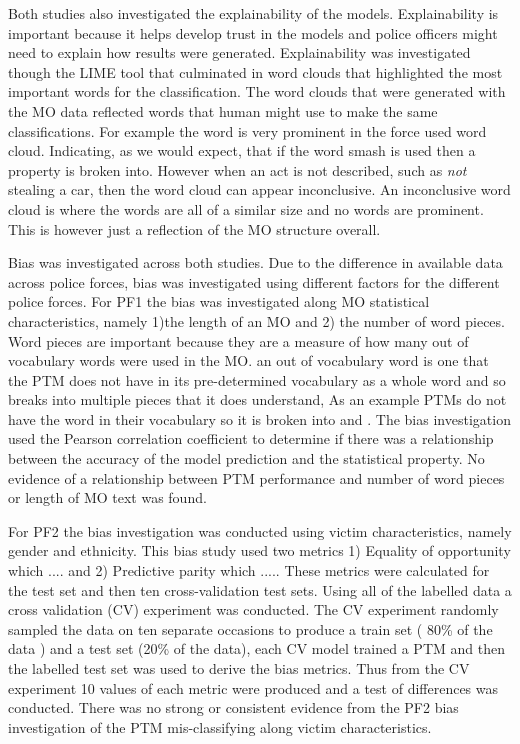 Both studies also investigated the explainability of the models. Explainability is important because it helps develop trust in the models and police officers might need to explain how results were generated. Explainability was investigated though the LIME tool that culminated in word clouds that highlighted the most important words for the classification.  The word clouds that were generated with the MO data reflected words that human might use to make the same classifications. For example the word  is very prominent in the force used word cloud. Indicating, as we would expect, that if the word smash is used then a property is broken into. However when an act is not described, such as \emph{not} stealing a car, then the word cloud can appear inconclusive. An inconclusive word cloud is where the words are all of a similar size and no words are prominent. This is however just a reflection of the MO structure overall.

Bias was investigated across both studies. Due to the difference in available data across police forces, bias was investigated using different factors for the different police forces. For PF1 the bias was investigated along MO statistical characteristics, namely 1)the length of an MO and 2) the number of word pieces. Word pieces are important because they are a measure of how many out of vocabulary words were used in the MO. an out of vocabulary word is one that the PTM does not have in its pre-determined vocabulary as a whole word and so breaks into multiple pieces that it does understand, As an example PTMs do not have the word   in their vocabulary so it is broken into  and . The bias investigation used the Pearson correlation coefficient to determine if there was a relationship between the accuracy of the model prediction and the statistical property. No evidence of a relationship between PTM performance and number of word pieces or length of MO text was found.


For PF2 the bias investigation was conducted using victim characteristics, namely gender and ethnicity. This bias study used two metrics 1) Equality of opportunity which .... and 2) Predictive parity which ..... These metrics were calculated for the test set and then ten cross-validation test sets. Using all of the labelled data a cross validation (CV) experiment was conducted. The CV experiment randomly sampled the data on ten separate occasions to produce a train set ( 80\% of the data ) and a test set (20\% of the data), each CV model trained a PTM and then the labelled test set was used to derive the bias metrics. Thus from the CV experiment 10 values of each metric were produced and a test of differences was conducted. There was no strong or consistent evidence from the PF2 bias investigation of the PTM mis-classifying along victim characteristics.

